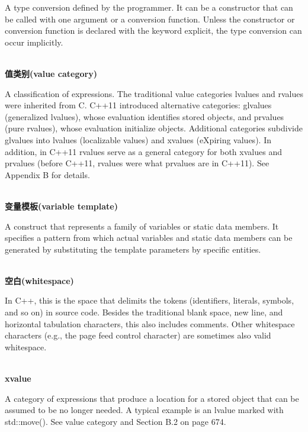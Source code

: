 A type conversion defined by the programmer. It can be a constructor that can be called with one argument or a conversion function. Unless the constructor or conversion function is declared with the keyword explicit, the type conversion can occur implicitly.

\hspace*{\fill} \\ %
\noindent
\textbf{值类别(value category)}

A classification of expressions. The traditional value categories lvalues and rvalues were inherited from C. C++11 introduced alternative categories: glvalues (generalized lvalues), whose evaluation identifies stored objects, and prvalues (pure rvalues), whose evaluation initialize objects. Additional categories subdivide glvalues into lvalues (localizable values) and xvalues (eXpiring values). In addition, in C++11 rvalues serve as a general category for both xvalues and prvalues (before C++11, rvalues were what prvalues are in C++11). See Appendix B for details.

\hspace*{\fill} \\ %
\noindent
\textbf{变量模板(variable template)}

A construct that represents a family of variables or static data members. It specifies a pattern from which actual variables and static data members can be generated by substituting the template parameters by specific entities.

\hspace*{\fill} \\ %
\noindent
\textbf{空白(whitespace)}

In C++, this is the space that delimits the tokens (identifiers, literals, symbols, and so on) in source code. Besides the traditional blank space, new line, and horizontal tabulation characters, this also includes comments. Other whitespace characters (e.g., the page feed control character) are sometimes also valid whitespace.

\hspace*{\fill} \\ %
\noindent
\textbf{xvalue}

A category of expressions that produce a location for a stored object that can be assumed to be no longer needed. A typical example is an lvalue marked with std::move(). See value category and Section B.2 on page 674.





















